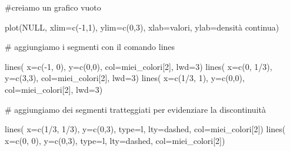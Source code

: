 \documentclass[
  italian,
  letterpaper,
]{book}
\newenvironment{Shaded}{\begin{snugshade}}{\end{snugshade}}
\newcommand{\AttributeTok}[1]{\textcolor[rgb]{0.40,0.45,0.13}{#1}}
\newcommand{\CommentTok}[1]{\textcolor[rgb]{0.37,0.37,0.37}{#1}}
\newcommand{\ConstantTok}[1]{\textcolor[rgb]{0.56,0.35,0.01}{#1}}
\newcommand{\DecValTok}[1]{\textcolor[rgb]{0.68,0.00,0.00}{#1}}
\newcommand{\FunctionTok}[1]{\textcolor[rgb]{0.28,0.35,0.67}{#1}}
\newcommand{\NormalTok}[1]{\textcolor[rgb]{0.00,0.23,0.31}{#1}}
\newcommand{\SpecialCharTok}[1]{\textcolor[rgb]{0.37,0.37,0.37}{#1}}
\newcommand{\StringTok}[1]{\textcolor[rgb]{0.13,0.47,0.30}{#1}}
\theoremstyle{definition}
\theoremstyle{remark}
\begin{document}
\begin{Shaded}
\begin{Highlighting}[]
\CommentTok{\#creiamo un grafico vuoto}

\FunctionTok{plot}\NormalTok{(}\ConstantTok{NULL}\NormalTok{, }\AttributeTok{xlim=}\FunctionTok{c}\NormalTok{(}\SpecialCharTok{{-}}\DecValTok{1}\NormalTok{,}\DecValTok{1}\NormalTok{), }\AttributeTok{ylim=}\FunctionTok{c}\NormalTok{(}\DecValTok{0}\NormalTok{,}\DecValTok{3}\NormalTok{), }\AttributeTok{xlab=}\StringTok{\textquotesingle{}valori\textquotesingle{}}\NormalTok{, }\AttributeTok{ylab=}\StringTok{\textquotesingle{}densità continua\textquotesingle{}}\NormalTok{)}

\CommentTok{\# aggiungiamo i segmenti con il comando lines}

\FunctionTok{lines}\NormalTok{( }\AttributeTok{x=}\FunctionTok{c}\NormalTok{(}\SpecialCharTok{{-}}\DecValTok{1}\NormalTok{, }\DecValTok{0}\NormalTok{), }\AttributeTok{y=}\FunctionTok{c}\NormalTok{(}\DecValTok{0}\NormalTok{,}\DecValTok{0}\NormalTok{), }\AttributeTok{col=}\NormalTok{miei\_colori[}\DecValTok{2}\NormalTok{], }\AttributeTok{lwd=}\DecValTok{3}\NormalTok{)}
\FunctionTok{lines}\NormalTok{( }\AttributeTok{x=}\FunctionTok{c}\NormalTok{(}\DecValTok{0}\NormalTok{, }\DecValTok{1}\SpecialCharTok{/}\DecValTok{3}\NormalTok{), }\AttributeTok{y=}\FunctionTok{c}\NormalTok{(}\DecValTok{3}\NormalTok{,}\DecValTok{3}\NormalTok{), }\AttributeTok{col=}\NormalTok{miei\_colori[}\DecValTok{2}\NormalTok{], }\AttributeTok{lwd=}\DecValTok{3}\NormalTok{)}
\FunctionTok{lines}\NormalTok{( }\AttributeTok{x=}\FunctionTok{c}\NormalTok{(}\DecValTok{1}\SpecialCharTok{/}\DecValTok{3}\NormalTok{, }\DecValTok{1}\NormalTok{), }\AttributeTok{y=}\FunctionTok{c}\NormalTok{(}\DecValTok{0}\NormalTok{,}\DecValTok{0}\NormalTok{), }\AttributeTok{col=}\NormalTok{miei\_colori[}\DecValTok{2}\NormalTok{], }\AttributeTok{lwd=}\DecValTok{3}\NormalTok{)}

\CommentTok{\# aggiungiamo dei segmenti tratteggiati per evidenziare la discontinuità}

\FunctionTok{lines}\NormalTok{( }\AttributeTok{x=}\FunctionTok{c}\NormalTok{(}\DecValTok{1}\SpecialCharTok{/}\DecValTok{3}\NormalTok{, }\DecValTok{1}\SpecialCharTok{/}\DecValTok{3}\NormalTok{), }\AttributeTok{y=}\FunctionTok{c}\NormalTok{(}\DecValTok{0}\NormalTok{,}\DecValTok{3}\NormalTok{), }\AttributeTok{type=}\StringTok{\textquotesingle{}l\textquotesingle{}}\NormalTok{, }\AttributeTok{lty=}\StringTok{\textquotesingle{}dashed\textquotesingle{}}\NormalTok{, }\AttributeTok{col=}\NormalTok{miei\_colori[}\DecValTok{2}\NormalTok{])}
\FunctionTok{lines}\NormalTok{( }\AttributeTok{x=}\FunctionTok{c}\NormalTok{(}\DecValTok{0}\NormalTok{, }\DecValTok{0}\NormalTok{), }\AttributeTok{y=}\FunctionTok{c}\NormalTok{(}\DecValTok{0}\NormalTok{,}\DecValTok{3}\NormalTok{), }\AttributeTok{type=}\StringTok{\textquotesingle{}l\textquotesingle{}}\NormalTok{, }\AttributeTok{lty=}\StringTok{\textquotesingle{}dashed\textquotesingle{}}\NormalTok{, }\AttributeTok{col=}\NormalTok{miei\_colori[}\DecValTok{2}\NormalTok{])}
\end{Highlighting}
\end{Shaded}
\end{document}
